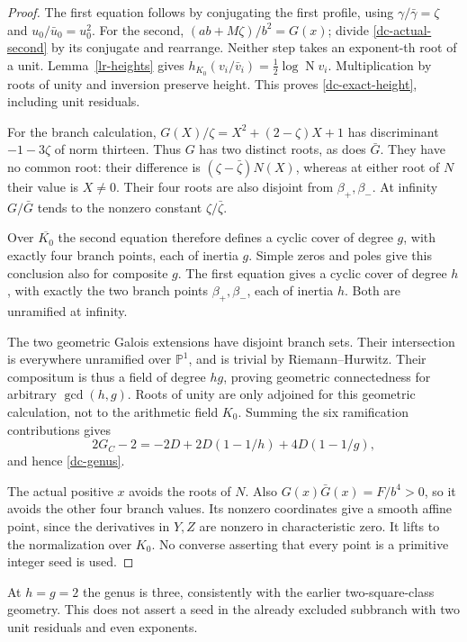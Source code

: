 \begin{proof}
The first equation follows by conjugating the first profile, using
$\gamma/\bar\gamma=\zeta$ and $u_0/\bar u_0=u_0^2$.
For the second, $(ab+M\zeta)/b^2=G(x)$; divide
\eqref{dc-actual-second} by its conjugate and rearrange.
Neither step takes an exponent-th root of a unit.
Lemma~\ref{lr-heights} gives
$h_{K_0}(v_i/\bar v_i)=\tfrac12\log\operatorname N v_i$.
Multiplication by roots of unity and inversion preserve height.
This proves \eqref{dc-exact-height}, including unit residuals.

For the branch calculation,
$G(X)/\zeta=X^2+(2-\zeta)X+1$ has discriminant $-1-3\zeta$
of norm thirteen. Thus $G$ has two distinct roots, as does $\bar G$.
They have no common root: their difference is
$(\zeta-\bar\zeta)N(X)$, whereas at either root of $N$ their
value is $X\ne0$. Their four roots are also disjoint from
$\beta_+,\beta_-$. At infinity $G/\bar G$ tends to the nonzero
constant $\zeta/\bar\zeta$.

Over $\overline{K_0}$ the second equation therefore defines a
cyclic cover of degree $g$, with exactly four branch points,
each of inertia $g$. Simple zeros and poles give this conclusion
also for composite $g$. The first equation gives a cyclic cover
of degree $h$, with exactly the two branch points
$\beta_+,\beta_-$, each of inertia $h$. Both are unramified
at infinity.

The two geometric Galois extensions have disjoint branch sets.
Their intersection is everywhere unramified over $\mathbb P^1$,
and is trivial by Riemann--Hurwitz. Their compositum is thus a
field of degree $hg$, proving geometric connectedness for arbitrary
$\gcd(h,g)$. Roots of unity are only adjoined for this geometric
calculation, not to the arithmetic field $K_0$. Summing the six
ramification contributions gives
\[
 2G_C-2=-2D+2D(1-1/h)+4D(1-1/g),
\]
and hence \eqref{dc-genus}.

The actual positive $x$ avoids the roots of $N$. Also
$G(x)\bar G(x)=F/b^4>0$, so it avoids the other four branch
values. Its nonzero coordinates give a smooth affine point, since
the derivatives in $Y,Z$ are nonzero in characteristic zero.
It lifts to the normalization over $K_0$. No converse asserting
that every point is a primitive integer seed is used.
\end{proof}

At $h=g=2$ the genus is three, consistently with the earlier
two-square-class geometry. This does not assert a seed in the
already excluded subbranch with two unit residuals and even exponents.

